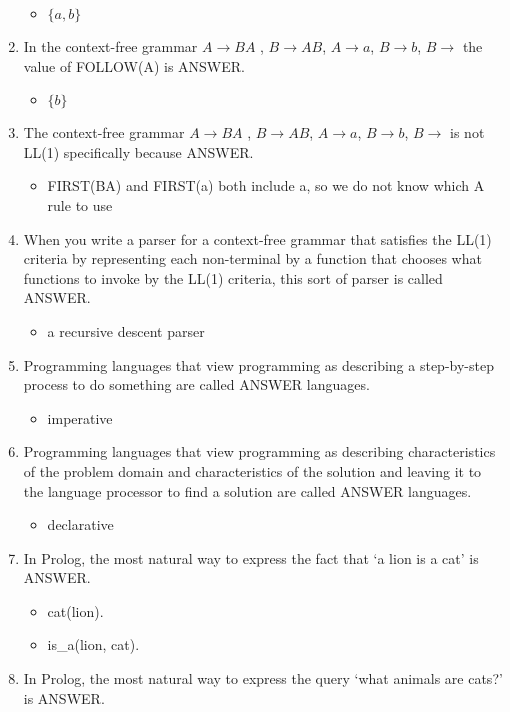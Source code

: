 \documentclass{exam}
\begin{document}
\begin{enumerate}
\begin{itemize}
\item $\{a,b\}$
\end{itemize}
\item In the context-free grammar $A \rightarrow B A$ , $B \rightarrow A B$, $A \rightarrow a$, $B \rightarrow b$, $B \rightarrow$  the value of FOLLOW(A) is ANSWER.
\begin{itemize}
\item $\{b\}$
\end{itemize}
\item The context-free grammar $A \rightarrow B A$ , $B \rightarrow A B$, $A \rightarrow a$, $B \rightarrow b$, $B \rightarrow$  is not LL(1) specifically because ANSWER.
\begin{itemize}
\item FIRST(BA) and FIRST(a) both include a, so we do not know which A rule to use
\end{itemize}
\item When you write a parser for a context-free grammar that satisfies the LL(1) criteria by representing each non-terminal by a function that chooses what functions to invoke by the LL(1) criteria, this sort of parser is called ANSWER.
\begin{itemize}
\item a recursive descent parser
\end{itemize}
\item Programming languages that view programming as describing a step-by-step process to do something are called ANSWER languages.
\begin{itemize}
\item imperative
\end{itemize}
\item Programming languages that view programming as describing characteristics of the problem domain and characteristics of the solution and leaving it to the language processor to find a solution are called ANSWER languages.
\begin{itemize}
\item declarative
\end{itemize}
\item In Prolog, the most natural way to express the fact that `a lion is a cat' is ANSWER.
\begin{itemize}
\item cat(lion).
\item is\_a(lion, cat).
\end{itemize}
\item In Prolog, the most natural way to express the query `what animals are cats?' is ANSWER.

\end{enumerate}
\end{document}
